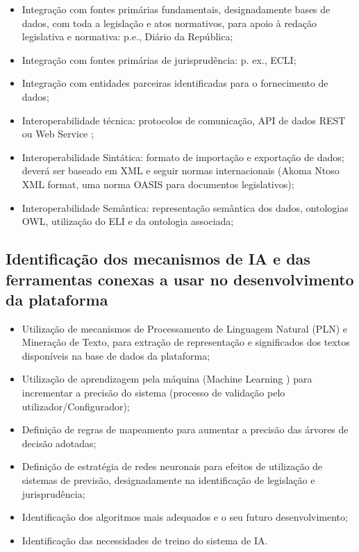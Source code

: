 \begin{itemize}
\item Integração com fontes primárias fundamentais, designadamente bases de dados, com toda a
legislação e atos normativos, para apoio à redação legislativa e normativa: p.e., Diário da
República;
\item Integração com fontes primárias de jurisprudência: p. ex., ECLI;
\item Integração com entidades parceiras identificadas para o fornecimento de dados;
\item Interoperabilidade técnica: protocolos de comunicação, API de dados REST ou Web Service ;
\item Interoperabilidade Sintática: formato de importação e exportação de dados; deverá ser baseado
em XML e seguir normas internacionais (Akoma Ntoso XML format, uma norma OASIS para
documentos legislativos);
\item Interoperabilidade Semântica: representação semântica dos dados, ontologias OWL, utilização
do ELI e da ontologia associada;
\end{itemize}

\subsection{Identificação dos mecanismos de IA e das ferramentas conexas a usar no desenvolvimento
da plataforma}

\begin{itemize}
\item Utilização de mecanismos de Processamento de Linguagem Natural (PLN) e Mineração de
Texto, para extração de representação e significados dos textos disponíveis na base de dados
da plataforma;
\item Utilização de aprendizagem pela máquina (Machine Learning ) para incrementar a precisão do
sistema (processo de validação pelo utilizador/Configurador);
\item Definição de regras de mapeamento para aumentar a precisão das árvores de decisão
adotadas;
\item Definição de estratégia de redes neuronais para efeitos de utilização de sistemas de previsão,
designadamente na identificação de legislação e jurisprudência;
\item Identificação dos algoritmos mais adequados e o seu futuro desenvolvimento;
\item Identificação das necessidades de treino do sistema de IA.
\end{itemize}


